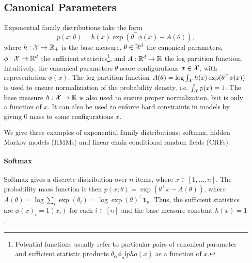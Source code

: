 \documentclass[11pt]{article}
\begin{document}
\subsection{Canonical Parameters}
Exponential family distributions take the form
\begin{equation}
    \label{eqn:exp-canon}
    p(x;\theta) = h(x)\exp(\theta^\top \phi(x)-A(\theta)),
\end{equation}
where $h:\mathcal{X}\to\mathbb{R}_+$ is the base measure,
$\theta\in\mathbb{R}^d$ the canonical parameters,
$\phi:\mathcal{X}\to\mathbb{R}^d$ the sufficient statistics\footnote{Potential functions usually refer to
particular pairs of canonical parameter and sufficient statistic products
$\theta_\alpha\phi_alpha(x)$ as a function of $x$.},
and $A:\mathbb{R}^d\to\mathbb{R}$ the log partition function.
Intuitively, the canonical parameters $\theta$ score configurations $x\in\mathcal{X}$,
with representation $\phi(x)$.
The log partition function $A(\theta) = \log\int_{\mathcal{X}}h(x)\exp(\theta^\top\phi(x))$
is used to ensure normaliziation of the probability density,
i.e. $\int_{\mathcal{X}}p(x) = 1$.
The base measure $h:\mathcal{X}\to\mathbb{R}$ is also used to ensure proper normalization,
but is only a function of $x$.
It can also be used to enforce hard constraints in models by giving
0 mass to some configurations $x$.

We give three examples of exponential family distributions:
softmax, hidden Markov models (HMMs)
and linear chain conditional random fields (CRFs).

\paragraph{Softmax}
Softmax gives a discrete distribution over $n$ items, where $x\in[1,\ldots,n]$.
The probability mass function is then $p(x;\theta) = \exp(\theta^\top x - A(\theta))$,
where $A(\theta) = \log \sum_i \exp(\theta_i) = \log \exp(\theta)^\top\mathbf{1}_n$.
Thus, the sufficient statistics are $\phi(x)_i = 1(x_i)$ for each $i\in[n]$ and
the base measure constant $h(x)=1$.
\end{document}

